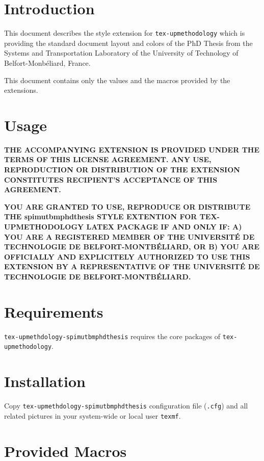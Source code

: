 \documentclass[article,english]{upmethodology-document}
\begin{document}
\section{Introduction}

This document describes the style extension for \texttt{tex-upmethodology} which is providing the standard document layout and colors of the PhD Thesis from the Systems and Transportation Laboratory of the University of Technology of Belfort-Monb\'eliard, France.

This document contains only the values and the macros provided by the extensions.

\section{Usage}

\textbf{THE ACCOMPANYING EXTENSION IS PROVIDED UNDER THE TERMS OF THIS LICENSE AGREEMENT. ANY USE, REPRODUCTION OR DISTRIBUTION OF THE EXTENSION CONSTITUTES RECIPIENT'S ACCEPTANCE OF THIS AGREEMENT.}

\textbf{YOU ARE GRANTED TO USE, REPRODUCE OR DISTRIBUTE THE spimutbmphdthesis STYLE EXTENTION FOR TEX-UPMETHODOLOGY LATEX PACKAGE IF AND ONLY IF: A) YOU ARE A REGISTERED MEMBER OF THE UNIVERSIT\'E DE TECHNOLOGIE DE BELFORT-MONTB\'ELIARD, OR B) YOU ARE OFFICIALLY AND EXPLICITELY AUTHORIZED TO USE THIS EXTENSION BY A REPRESENTATIVE OF THE UNIVERSIT\'E DE TECHNOLOGIE DE BELFORT-MONTB\'ELIARD.}

\section{Requirements}

\texttt{tex-upmethdology-spimutbmphdthesis} requires the core packages of \texttt{tex-upmethodology}.

\section{Installation}

Copy \texttt{tex-upmethdology-spimutbmphdthesis} configuration file (\texttt{.cfg}) and all related pictures in your system-wide or local user \texttt{texmf}.

\section{Provided Macros}
\end{document}
